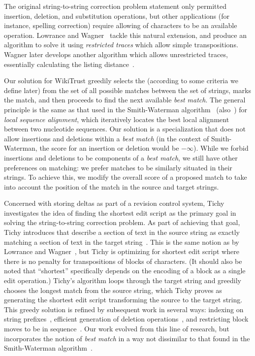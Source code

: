 The original string-to-string correction problem statement
only permitted insertion, deletion, and substitution operations,
but other applications
(for instance, spelling correction) require allowing 
of characters to be an available operation.
Lowrance and Wagner~\cite{Lowrance1975} tackle this natural extension,
and produce an algorithm to solve it using \textit{restricted traces}
which allow simple transpositions.
Wagner later develops another algorithm which allows unrestricted
traces, essentially calculating the listing
distance~\cite{Wagner1975,Sankoff1999}.

Our solution for WikiTrust greedily selects the 
(according to some criteria we define later)
from the set of all possible matches between the set of strings, marks
the match, and then proceeds to find the next available \textit{best match}.
The general principle is the same as that used in the
Smith-Waterman algorithm~\cite{Smith1981} (also~\cite[Ch.~10]{Sankoff1999})
for \textit{local sequence alignment}, which iteratively locates the
best local alignment between two nucleotide sequences.
Our solution is a specialization that does not allow insertions
and deletions within a \textit{best match} (in the context of
Smith-Waterman, the score for an insertion or deletion would be $-\infty$).
While we forbid insertions and deletions to be components of
a \textit{best match}, we still have other preferences on matching:
we prefer matches to be similarly situated in their strings.
To achieve this, we modify the overall score of a proposed match to take
into account the position of the match in the source and target strings.

Concerned with storing deltas as part of a revision control system,
Tichy investigates the idea of finding the shortest edit script as
the primary goal in solving the string-to-string correction problem.
As part of achieving that goal, Tichy introduces 
that describe a section of text in the source string as exactly matching
a section of text in the target string~\cite{Tichy1984}.
This is the same notion as  by
Lowrance and Wagner~\cite{Lowrance1975}, but Tichy is optimizing
for shortest edit script where there is no penalty for transpositions
of blocks of characters.
(It should also be noted that ``shortest'' specifically depends on
the encoding of a block as a single edit operation.)
Tichy's algorithm loops through the target string and greedily chooses
the longest match from the source string, which Tichy proves as
generating the shortest edit script transforming the source to the
target string.
This greedy solution is refined by subsequent work in several ways:
indexing on string prefixes~\cite{Obst1987},
efficient generation of deletion operations~\cite{Reichenberger1991},
and restricting block moves to be in sequence~\cite{Burns1997}.
Our work evolved from this line of research, but
incorporates the notion of \textit{best match}
in a way not dissimilar to that found in the Smith-Waterman
algorithm~\cite{Smith1981}.

